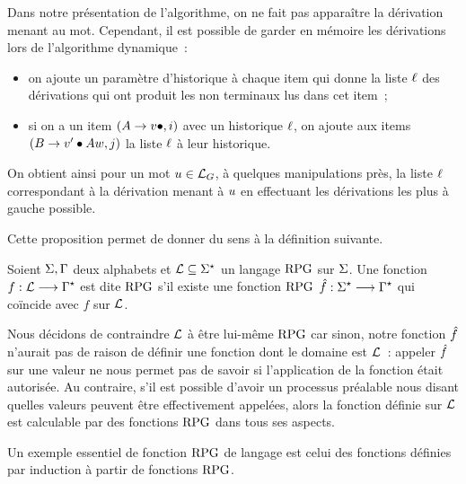 \begin{remark}
  Dans notre présentation de l'algorithme, on ne fait pas apparaître la
  dérivation menant au mot. Cependant, il est possible de garder en mémoire les
  dérivations lors de l'algorithme dynamique~:
  \begin{itemize}
  \item on ajoute un paramètre d'historique à chaque item qui donne la liste
    $\ell$ des dérivations qui ont produit les non terminaux lus dans cet
    item~;
  \item si on a un item $(A\to v\bullet ,i)$ avec un historique
    $\ell$, on ajoute aux items $(B\to v'\bullet Aw,j)$
    la liste $\ell$ à leur historique.
  \end{itemize}
  On obtient ainsi pour un mot $u\in\mathcal L_{G}$, à quelques
  manipulations près, la liste $\ell$ correspondant à la dérivation menant
  à $u$ en effectuant les dérivations les plus à gauche possible.
\end{remark}

\noindent
Cette proposition permet de donner du sens à la définition suivante.

\begin{definition}
  Soient $\Sigma,\Gamma$ deux alphabets et $\mathcal L \subseteq \Sigma^{\star}$ un
  langage $\operatorname{RPG}$ sur $\Sigma$. Une fonction $f : \displaystyle \mathcal L \longrightarrow \Gamma^{\star}$ est
  dite $\operatorname{RPG}$ s'il existe une fonction $\operatorname{RPG}$
  $\hat{f} : \displaystyle \Sigma^{\star} \longrightarrow \Gamma^{\star}$ qui coïncide avec $f$
  sur $\mathcal L$.
\end{definition}

\begin{remark}
  Nous décidons de contraindre $\mathcal L$ à être lui-même $\operatorname{RPG}$ car sinon, notre
  fonction $\hat{f}$ n'aurait pas de raison de définir une fonction dont le
  domaine est $\mathcal L$~: appeler $\hat{f}$ sur une valeur ne nous permet pas
  de savoir si l'application de la fonction était autorisée. Au contraire, s'il
  est possible d'avoir un processus préalable nous disant quelles valeurs
  peuvent être effectivement appelées, alors la fonction définie sur $\mathcal L$
  est calculable par des fonctions $\operatorname{RPG}$ dans tous ses aspects.
\end{remark}

Un exemple essentiel de fonction $\operatorname{RPG}$ de langage est celui des fonctions
définies par induction à partir de fonctions $\operatorname{RPG}$.


